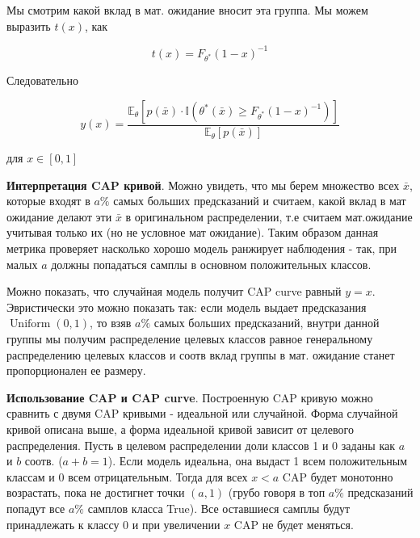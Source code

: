 \documentclass{article}
\begin{document}
    Мы смотрим какой вклад в мат. ожидание вносит эта группа. Мы можем выразить $t(x)$, как 

    \begin{equation}
        t(x) = F_{\theta^{*}}(1 - x)^{-1}
    \end{equation}

    Следовательно

    \begin{equation}
        y(x) = \frac{\mathbb{E}_{\theta}[p(\bar{x}) \cdot \mathbb{I}(\theta^{*}(\bar{x}) \geq F_{\theta^{*}}(1 - x)^{-1}) ]}{\mathbb{E}_{\theta}[p(\bar{x})]}
    \end{equation}

    для $x \in [0, 1]$

    \quad 

    \textbf{Интерпретация CAP кривой}. Можно увидеть, что мы берем множество всех 
    $\bar{x}$, которые входят в $a\%$ самых больших предсказаний
    и считаем, какой вклад в мат ожидание делают эти $\bar{x}$ в оригинальном распределении, т.е считаем мат.ожидание учитывая только их 
    (но не условное мат ожидание). Таким образом данная метрика проверяет насколько хорошо модель ранжирует наблюдения - 
    так, при малых $a$ должны попадаться самплы в основном положительных классов. 

    \quad 

    Можно показать, что случайная модель получит CAP curve равный $y=x$. Эвристически это можно показать так: 
    если модель выдает предсказания $\operatorname{Uniform}(0, 1)$, то взяв $a\%$ самых больших предсказаний, внутри данной 
    группы мы получим распределение целевых классов равное генеральному распределению целевых классов и соотв вклад 
    группы в мат. ожидание станет пропорционален ее размеру. 

    \quad 

    \textbf{Использование CAP и CAP curve}. Построенную CAP кривую можно сравнить с двумя CAP кривыми - 
    идеальной или случайной. Форма случайной кривой описана выше, а форма идеальной кривой зависит от целевого распределения.
    Пусть в целевом распределении доли классов 1 и 0 заданы как $a$ и $b$ соотв. ($a + b = 1$). 
    Если модель идеальна, она выдаст 1 всем положительным классам и 0 всем отрицательным. Тогда для всех $x < a$ 
    CAP будет монотонно возрастать, пока не достигнет точки $(a, 1)$ (грубо говоря в топ $a\%$ предсказаний попадут
    все $a\%$ самплов класса True). Все оставшиеся самплы будут принадлежать к классу 0 и при увеличении $x$ 
    CAP не будет меняться. 
\end{document}
